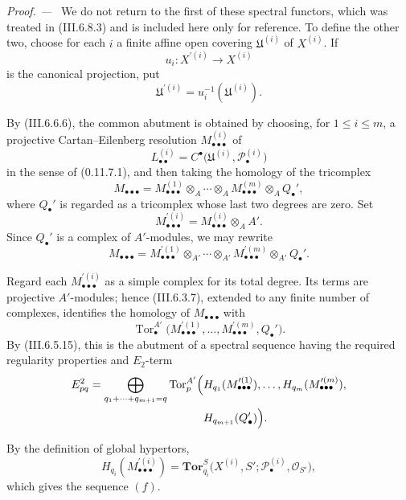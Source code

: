 \documentclass[10pt,oneside]{book}
\newcommand{\sh}[1]{\mathscr{#1}}
\newcommand{\Tor}{\operatorname{Tor}}
\newcommand{\sref}[2][]{(#2)}
\newcommand{\oldpage}[2][]{\setcounter{footnote}{0}\marginpar{\scriptsize\textbf{#1}~|~#2}\ignorespaces}
\newenvironment{proof}{\par\medskip\noindent\textit{Proof. ---\ }}{\par}
\begin{document}
\begin{proof}
We do not return to the first of these spectral functors, which was
treated in \sref{III.6.8.3} and is included here only for reference.
To define the other two, choose for each $i$ a finite affine open
covering $\mathfrak U^{(i)}$ of $X^{(i)}$.  If
\[
  u_i:X^{\prime(i)}\longrightarrow X^{(i)}
\]
is the canonical projection, put
\[
  \mathfrak U^{\prime(i)}
  =
  u_i^{-1}(\mathfrak U^{(i)}).
\]

By \sref{III.6.6.6}, the common abutment is obtained by choosing,
for $1\leq i\leq m$, a projective Cartan--Eilenberg resolution
$M_{\bullet\bullet\bullet}^{(i)}$ of
\[
  L_{\bullet\bullet}^{(i)}
  =
  C^\bullet
  \bigl(
    \mathfrak U^{(i)},\sh P_\bullet^{(i)}
  \bigr)
\]
in the sense of \sref[0]{0.11.7.1}, and then taking the homology of
the tricomplex
\[
  M_{\bullet\bullet\bullet}
  =
  M_{\bullet\bullet\bullet}^{(1)}
  \otimes_A\cdots\otimes_A
  M_{\bullet\bullet\bullet}^{(m)}
  \otimes_A Q_\bullet',
\]
where $Q_\bullet'$ is regarded as a tricomplex whose last two
degrees are zero.  Set
\[
  M_{\bullet\bullet\bullet}^{\prime(i)}
  =
  M_{\bullet\bullet\bullet}^{(i)}\otimes_AA'.
\]
Since $Q_\bullet'$ is a complex of $A'$-modules, we may rewrite
\[
  M_{\bullet\bullet\bullet}
  =
  M_{\bullet\bullet\bullet}^{\prime(1)}
  \otimes_{A'}\cdots\otimes_{A'}
  M_{\bullet\bullet\bullet}^{\prime(m)}
  \otimes_{A'}Q_\bullet'.
\]

Regard each $M_{\bullet\bullet\bullet}^{\prime(i)}$ as a simple
complex for its total degree.  Its terms are projective
$A'$-modules; hence \sref{III.6.3.7}, extended to any finite number
of complexes, identifies the homology of
$M_{\bullet\bullet\bullet}$ with
\[
  \Tor_\bullet^{A'}
  \bigl(
    M_{\bullet\bullet\bullet}^{\prime(1)},\ldots,
    M_{\bullet\bullet\bullet}^{\prime(m)},Q_\bullet'
  \bigr).
\]
By \sref{III.6.5.15}, this is the abutment of a spectral sequence
having the required regularity properties and $E_2$-term
\[
\begin{split}
  E_{pq}^2
  =
  \bigoplus_{q_1+\cdots+q_{m+1}=q}
  \Tor_p^{A'}
  \Bigl(
    &
    H_{q_1}(M_{\bullet\bullet\bullet}^{\prime(1)}),\ldots,
    H_{q_m}(M_{\bullet\bullet\bullet}^{\prime(m)}),
    \\
    &
    H_{q_{m+1}}(Q_\bullet')
  \Bigr).
\end{split}
\]
\oldpage[III]{168}

By the definition of global hypertors,
\[
  H_{q_i}(M_{\bullet\bullet\bullet}^{\prime(i)})
  =
  \mathbf{Tor}_{q_i}^S
  \bigl(
    X^{(i)},S';
    \sh P_\bullet^{(i)},\sh O_{S'}
  \bigr),
\]
which gives the sequence $(f)$.


\end{proof}
\end{document}
